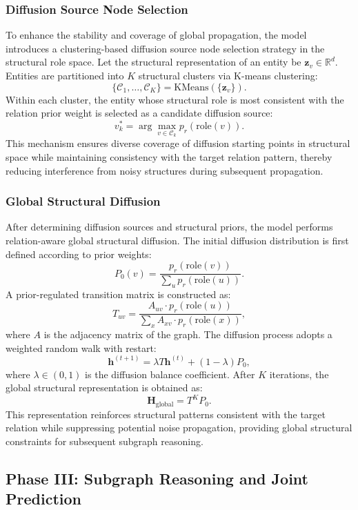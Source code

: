 \documentclass[preprint,12pt]{elsarticle}
\begin{document}
\subsubsection{Diffusion Source Node Selection}
To enhance the stability and coverage of global propagation, the model introduces a clustering-based diffusion source node selection strategy in the structural role space. Let the structural representation of an entity be $\mathbf{z}_v \in \mathbb{R}^d$. Entities are partitioned into $K$ structural clusters via K-means clustering:
\[
\{\mathcal{C}_1,\dots,\mathcal{C}_K\}=\text{KMeans}(\{\mathbf{z}_v\}).
\]
Within each cluster, the entity whose structural role is most consistent with the relation prior weight is selected as a candidate diffusion source:
\[
v_k^\ast=\arg\max_{v\in\mathcal{C}_k} p_r(\text{role}(v)).
\]
This mechanism ensures diverse coverage of diffusion starting points in structural space while maintaining consistency with the target relation pattern, thereby reducing interference from noisy structures during subsequent propagation.
\subsubsection{Global Structural Diffusion}
After determining diffusion sources and structural priors, the model performs relation-aware global structural diffusion. The initial diffusion distribution is first defined according to prior weights:
\[
P_0(v)=\frac{p_r(\text{role}(v))}{\sum_{u}p_r(\text{role}(u))}.
\]
A prior-regulated transition matrix is constructed as:
\[
T_{uv}=
\frac{A_{uv}\cdot p_r(\text{role}(u))}{\sum_x A_{xv}\cdot p_r(\text{role}(x))},
\]
where $A$ is the adjacency matrix of the graph. The diffusion process adopts a weighted random walk with restart:
\[
\mathbf{h}^{(t+1)} = \lambda T \mathbf{h}^{(t)} + (1-\lambda)P_0,
\]
where $\lambda\in(0,1)$ is the diffusion balance coefficient. After $K$ iterations, the global structural representation is obtained as:
\[
\mathbf{H}_{\text{global}}=T^K P_0.
\]
This representation reinforces structural patterns consistent with the target relation while suppressing potential noise propagation, providing global structural constraints for subsequent subgraph reasoning.



%
\subsection{Phase III: Subgraph Reasoning and Joint Prediction}
\end{document}
